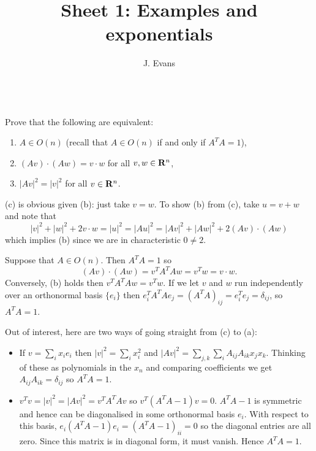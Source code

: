 \documentclass[12pt]{article}
\title{Sheet 1: Examples and exponentials}
\author{J. Evans}
\date{}
\begin{document}
\maketitle

\bigskip

\begin{question}\ \\
Prove that the following are equivalent:
\begin{enumerate}
\item[(a)] $A\in O(n)$ (recall that $A\in O(n)$ if and only if $A^TA=1$),
\item[(b)] $(Av)\cdot (Aw)=v\cdot w$ for all $v,w\in\mathbf{R}^n$,
\item[(c)] $|Av|^2=|v|^2$ for all $v\in\mathbf{R}^n$.
\end{enumerate}
\end{question}

\begin{answer}
(c) is obvious given (b): just take $v=w$. To show (b) from (c), take $u=v+w$ and note that
\[|v|^2+|w|^2+2v\cdot w=|u|^2=|Au|^2=|Av|^2+|Aw|^2+2(Av)\cdot(Aw)\]
which implies (b) since we are in characteristic $0\neq 2$.

Suppose that $A\in O(n)$. Then $A^TA=1$ so
\[(Av)\cdot(Aw)=v^TA^TAw=v^Tw=v\cdot w.\]
Conversely, (b) holds then $v^TA^TAw=v^Tw$. If we let $v$ and $w$ run independently over an orthonormal basis $\{e_i\}$ then $e_i^TA^TAe_j=(A^TA)_{ij}=e_i^Te_j=\delta_{ij}$, so $A^TA=1$.

Out of interest, here are two ways of going straight from (c) to (a):
\begin{itemize}
\item If $v=\sum_ix_ie_i$ then $|v|^2=\sum_ix_i^2$ and $|Av|^2=\sum_{j,k}\sum_iA_{ij}A_{ik}x_jx_k$. Thinking of these as polynomials in the $x_n$ and comparing coefficients we get $A_{ij}A_{ik}=\delta_{ij}$ so $A^TA=1$.
\item $v^Tv=|v|^2=|Av|^2=v^TA^TAv$ so $v^T(A^TA-1)v=0$. $A^TA-1$ is symmetric and hence can be diagonalised in some orthonormal basis $e_i$. With respect to this basis, $e_i(A^TA-1)e_i=(A^TA-1)_{ii}=0$ so the diagonal entries are all zero. Since this matrix is in diagonal form, it must vanish. Hence $A^TA=1$.
\end{itemize}
\end{answer}
\newpage

\bigskip
\end{document}
